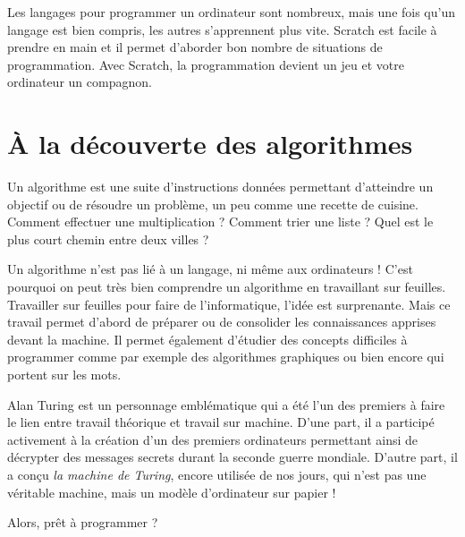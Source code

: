 \smallskip

Les langages pour programmer un ordinateur sont nombreux, mais une fois qu'un langage est bien compris, les autres s'apprennent plus vite.
Scratch est facile à prendre en main et il permet d'aborder bon nombre de situations de programmation.
Avec Scratch, la programmation devient un jeu et votre ordinateur un compagnon.

\vspace*{-2ex}

\section*{À la découverte des algorithmes}

\vspace*{-2ex}

Un algorithme est une suite d'instructions données permettant d'atteindre un objectif ou de résoudre un problème, un peu comme une recette de cuisine. Comment effectuer une multiplication ? Comment trier une liste ? Quel est le plus court chemin entre deux villes ?

\smallskip

Un algorithme n'est pas lié à un langage, ni même aux ordinateurs ! C'est pourquoi on peut très bien comprendre un algorithme en travaillant sur feuilles. Travailler sur feuilles pour faire de l'informatique, l'idée est surprenante. Mais ce travail permet d'abord de préparer ou de consolider les connaissances apprises devant la machine. Il permet également d'étudier des concepts difficiles à programmer comme par exemple des algorithmes graphiques ou bien encore qui portent sur les mots. 

\smallskip

Alan Turing est un personnage emblématique qui a été l'un des premiers à faire le lien entre travail théorique et travail sur machine. D'une part, il a participé activement à la création d'un des premiers ordinateurs permettant ainsi de décrypter des messages secrets durant la seconde guerre mondiale. D'autre part, il a conçu \emph{la machine de Turing}, encore utilisée de nos jours, qui n'est pas une véritable machine, mais un modèle d'ordinateur sur papier ! 

\medskip

\hfill Alors, prêt à programmer ?

\bigskip
\vspace*{\fill}


